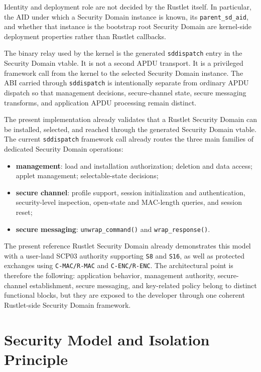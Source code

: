 Identity and deployment role are not decided by the Rustlet itself.
In particular, the AID under which a Security Domain instance is known,
its \texttt{parent\_sd\_aid}, and whether that instance is the bootstrap root
Security Domain are kernel-side deployment properties rather than Rustlet
callbacks.

The binary relay used by the kernel is the generated
\texttt{sddispatch} entry in the Security Domain vtable. It is not a
second APDU transport. It is a privileged framework call from the kernel
to the selected Security Domain instance. The ABI carried through
\texttt{sddispatch} is intentionally separate from ordinary APDU
dispatch so that management decisions, secure-channel state, secure
messaging transforms, and
application APDU processing remain distinct.

The present implementation already validates that a Rustlet Security
Domain can be installed, selected, and reached through the generated
Security Domain vtable. The current \texttt{sddispatch} framework call
already routes the three main families of dedicated Security Domain
operations:
\begin{itemize}
\item \textbf{management}: load and installation authorization; deletion and
  data access; applet management; selectable-state decisions;
\item \textbf{secure channel}: profile support, session initialization and
  authentication, security-level inspection, open-state and MAC-length
  queries, and session reset;
\item \textbf{secure messaging}: \texttt{unwrap\_command()} and
  \texttt{wrap\_response()}.
\end{itemize}

The present reference Rustlet Security Domain already demonstrates this
model with a user-land SCP03 authority supporting \texttt{S8} and
\texttt{S16}, as well as protected exchanges using
\texttt{C-MAC/R-MAC} and \texttt{C-ENC/R-ENC}. The architectural point
is therefore the following: application behavior, management authority,
secure-channel establishment, secure messaging, and key-related policy
belong to distinct functional blocks, but they are exposed to the
developer through one coherent Rustlet-side Security Domain framework.

\section{Security Model and Isolation Principle}


